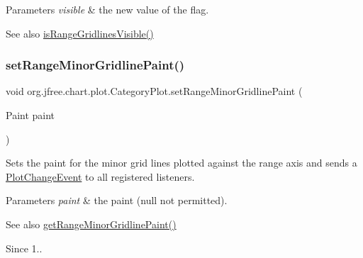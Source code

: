 \begin{DoxyParams}{Parameters}
{\em visible} & the new value of the flag.\\
\hline
\end{DoxyParams}
\begin{DoxySeeAlso}{See also}
\mbox{\hyperlink{classorg_1_1jfree_1_1chart_1_1plot_1_1_category_plot_a31df08c763e3a5318983fa25ffad923c}{is\+Range\+Gridlines\+Visible()}} 
\end{DoxySeeAlso}
\mbox{\label{classorg_1_1jfree_1_1chart_1_1plot_1_1_category_plot_ab73c99285bb575885f993a91f32d25b9}} 
\subsubsection{\texorpdfstring{set\+Range\+Minor\+Gridline\+Paint()}{setRangeMinorGridlinePaint()}}
{\footnotesize\ttfamily void org.\+jfree.\+chart.\+plot.\+Category\+Plot.\+set\+Range\+Minor\+Gridline\+Paint (\begin{DoxyParamCaption}\item[{Paint}]{paint }\end{DoxyParamCaption})}

Sets the paint for the minor grid lines plotted against the range axis and sends a \mbox{\hyperlink{}{Plot\+Change\+Event}} to all registered listeners.


\begin{DoxyParams}{Parameters}
{\em paint} & the paint ({\ttfamily null} not permitted).\\
\hline
\end{DoxyParams}
\begin{DoxySeeAlso}{See also}
\mbox{\hyperlink{classorg_1_1jfree_1_1chart_1_1plot_1_1_category_plot_a8674b0eb62f825645f314351468d24c1}{get\+Range\+Minor\+Gridline\+Paint()}}
\end{DoxySeeAlso}
\begin{DoxySince}{Since}
1.. 
\end{DoxySince}
\mbox{\label{classorg_1_1jfree_1_1chart_1_1plot_1_1_category_plot_a8ce4e87387bbf647f4c04f8d8c01998e}} 
